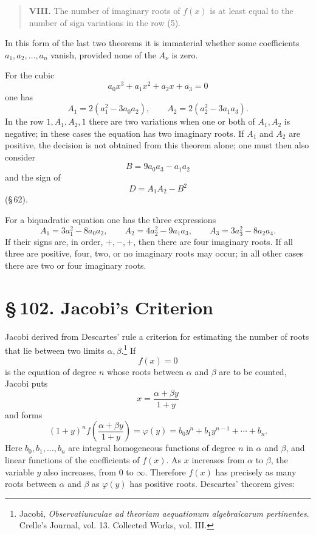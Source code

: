 \documentclass[11pt]{article}
\providecommand{\sect}[2]{\section*{\S\,#1. #2}}
\begin{document}
\begin{quote}
\textbf{VIII.} The number of imaginary roots of $f(x)$ is at least equal to the number of sign variations in the row (5).
\end{quote}

In this form of the last two theorems it is immaterial whether some coefficients $a_1,a_2,\ldots,a_n$ vanish, provided none of the $A_\nu$ is zero.

For the cubic
\[
        a_0x^3+a_1x^2+a_2x+a_3=0
\]
one has
\[
        A_1=2(a_1^2-3a_0a_2),\qquad
        A_2=2(a_2^2-3a_1a_3).
\]
In the row $1,A_1,A_2,1$ there are two variations when one or both of $A_1,A_2$ is negative; in these cases the equation has two imaginary roots. If $A_1$ and $A_2$ are positive, the decision is not obtained from this theorem alone; one must then also consider
\[
        B=9a_0a_3-a_1a_2
\]
and the sign of
\[
        D=A_1A_2-B^2
\]
(\S\,62).

For a biquadratic equation one has the three expressions
\[
        A_1=3a_1^2-8a_0a_2,\qquad
        A_2=4a_2^2-9a_1a_3,\qquad
        A_3=3a_3^2-8a_2a_4.
\]
If their signs are, in order, $+,-,+$, then there are four imaginary roots. If all three are positive, four, two, or no imaginary roots may occur; in all other cases there are two or four imaginary roots.

\sect{102}{Jacobi's Criterion}

Jacobi derived from Descartes' rule a criterion for estimating the number of roots that lie between two limits $\alpha,\beta$.\footnote{Jacobi, \emph{Observatiunculae ad theoriam aequationum algebraicarum pertinentes}. Crelle's Journal, vol. 13. Collected Works, vol. III.} If
\begin{equation}
        f(x)=0
\tag{1}
\end{equation}
is the equation of degree $n$ whose roots between $\alpha$ and $\beta$ are to be counted, Jacobi puts
\begin{equation}
        x=\frac{\alpha+\beta y}{1+y}
\tag{2}
\end{equation}
and forms
\begin{equation}
        (1+y)^n f\!\left(\frac{\alpha+\beta y}{1+y}\right)
        =\varphi(y)=b_0y^n+b_1y^{n-1}+\cdots+b_n.
\tag{3}
\end{equation}
Here $b_0,b_1,\ldots,b_n$ are integral homogeneous functions of degree $n$ in $\alpha$ and $\beta$, and linear functions of the coefficients of $f(x)$. As $x$ increases from $\alpha$ to $\beta$, the variable $y$ also increases, from $0$ to $\infty$. Therefore $f(x)$ has precisely as many roots between $\alpha$ and $\beta$ as $\varphi(y)$ has positive roots. Descartes' theorem gives:
\end{document}

